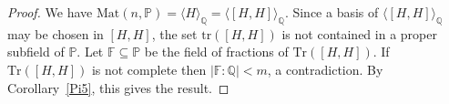 \documentclass[10pt,a4paper]{amsart}
\newcommand{\F}{\mathbb{F}}
\renewcommand{\P}{\mathbb{P}}
\newcommand{\Q}{\mathbb{Q}}
\newcommand{\tr}{\mathrm{tr}}
\begin{document}
\begin{proof}
We have $\mathrm{Mat}(n,\P)=\langle H \rangle_\Q =
 \langle [H,H] \rangle_\Q$. Since a basis of 
$\langle [H,H] \rangle_\Q$ may be chosen in $[H,H]$, 
the set $\tr([H,H])$ is not contained in a proper 
subfield of $\P$. Let $\F \subseteq \P$ be the field of 
fractions of $\mathrm{Tr}([H,H])$. If $\mathrm{Tr}([H,H])$ 
is not complete then $|\F : \Q| <m$, a contradiction.
By  Corollary~\ref{Pi5}, this gives the result.
\end{proof}
\end{document}
